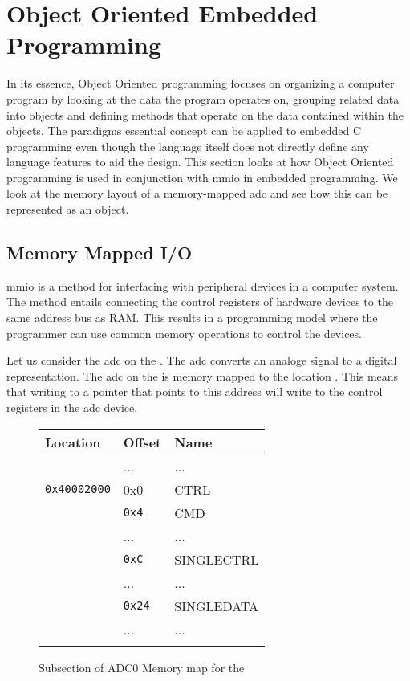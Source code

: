 \section{Object Oriented Embedded Programming}
\label{sec:back:oo}

In its essence, Object Oriented programming focuses on organizing a computer program by looking at the data the program operates on, grouping related data into objects and defining methods that operate on the data contained within the objects.
The paradigms essential concept can be applied to embedded C programming even though the language itself does not directly define any language features to aid the design.
This section looks at how Object Oriented programming is used in conjunction with \gls{mmio} in embedded programming.
We look at the memory layout of a memory-mapped \gls{adc} and see how this can be represented as an object.

\subsection{Memory Mapped I/O}
\label{ssec:memory_mapped_io}

\gls{mmio} is a method for interfacing with peripheral devices in a computer system.
The method entails connecting the control registers of hardware devices to the same address bus as RAM.
This results in a programming model where the programmer can use common memory operations to control the devices.

Let us consider the \gls{adc} on the \gecko.
The \gls{adc} converts an analoge signal to a digital representation.
The \gls{adc} on the \gecko is memory mapped to the location .
This means that writing to a pointer that points to this address will write to the control registers in the \gls{adc} device.

\begin{figure}[H]
  \centering
  \begin{tabular}{l|l|l|}
    \textbf{Location} & \textbf{Offset} & \textbf{Name} \\
    \hline
    &...&...\\
    \hline
    \hline
    \texttt{0x40002000} & 0x0 & CTRL\\
    \hline
    & \texttt{0x4} & CMD\\
    \hline
    &...&...\\
    \hline
    & \texttt{0xC} & SINGLECTRL\\
    \hline
    &...&...\\
    \hline
    & \texttt{0x24} & SINGLEDATA\\
    \hline
    &...&...\\
    \hline
    \hline
    &&\\
  \end{tabular}
  \caption{Subsection of ADC0 Memory map for the \gecko}
  \label{fig:back:memorymapped}
\end{figure}

